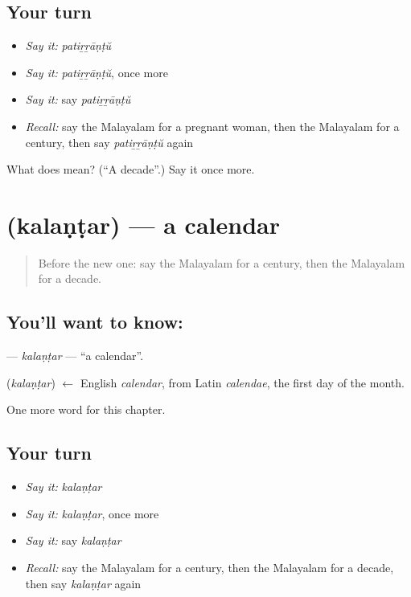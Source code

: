 \subsection*{Your turn}
\begin{itemize}
\raggedright
  \item \emph{Say it:} \emph{patiṟṟāṇṭŭ}
  \item \emph{Say it:} \emph{patiṟṟāṇṭŭ}, once more
  \item \emph{Say it:} say \emph{patiṟṟāṇṭŭ}
  \item \emph{Recall:} say the Malayalam for a pregnant woman, then the Malayalam for a century, then say \emph{patiṟṟāṇṭŭ} again
\end{itemize}

\begin{tcolorbox}[breakable,colback=teal!4,colframe=teal!35!black,title={Before you move on}]
What does  mean? (\textquotedblleft{}A decade\textquotedblright{}.) Say it once more.
\end{tcolorbox}
\section[\texorpdfstring{\ml{കലണ്ടർ} (kalaṇṭar)}{കലണ്ടർ (kalaṇṭar)}]{ (kalaṇṭar) — a calendar}

\label{lesson:ML-C314-kalantar}



\begin{quote}
Before the new one: say the Malayalam for a century, then the Malayalam for a decade.
\end{quote}

\subsection*{You'll want to know: }
\textbf{} — \emph{kalaṇṭar} — \textquotedblleft{}a calendar\textquotedblright{}.

\begin{cousinweb}
\textbf{} (\emph{kalaṇṭar}) $\leftarrow$ English \emph{calendar}, from Latin \emph{calendae}, the first day of the month.
\end{cousinweb}

\begin{grammarlens}[title={What you've built}]
One more word for this chapter.
\end{grammarlens}

\subsection*{Your turn}
\begin{itemize}
\raggedright
  \item \emph{Say it:} \emph{kalaṇṭar}
  \item \emph{Say it:} \emph{kalaṇṭar}, once more
  \item \emph{Say it:} say \emph{kalaṇṭar}
  \item \emph{Recall:} say the Malayalam for a century, then the Malayalam for a decade, then say \emph{kalaṇṭar} again
\end{itemize}

